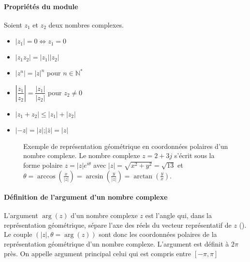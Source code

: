 \paragraph{Propriétés du module}
Soient $z_1$ et $z_2$ deux nombres complexes.
\begin{itemize}
    \item $|z_1|=0 \Leftrightarrow z_1=0$
    \item $|z_1z_2|=|z_1||z_2|$
    \item $|z^n|=|z|^n$ pour $n\in\mathbb{N}^*$
    \item $\left|\dfrac{z_1}{z_2}\right|=\dfrac{|z_1|}{|z_2|}$ pour $z_2\neq0$
    \item $|z_1+z_2|\le|z_1|+|z_2|$
    \item $|-z|=|z|$;$|\bar{z}|=|z|$
\end{itemize}
\begin{figure}[!h]
    \centering
    
    \caption{Exemple de représentation géométrique en coordonnées polaires 
             d'un nombre complexe. Le nombre complexe $z=2+3j$ s'écrit sous 
             la forme polaire $z=|z|e^{i\theta}$ avec 
             $|z|=\sqrt{x^2+y^2}=\sqrt{13}$ et 
             $\theta=\arccos{\left(\frac{x}{|z|}\right)}=
             \arcsin{\left(\frac{y}{|z|}\right)}=
             \arctan{\left(\frac{y}{x}\right)}$.\label{fig-plan_complexe2}}
\end{figure}
\paragraph{Définition de l'argument d'un nombre complexe}
L'argument $\arg{(z)}$ d'un nombre complexe $z$ est l'angle qui, dans la 
représentation géométrique, sépare l'axe des réels du vecteur représentatif de 
$z$ (). Le couple $(|z|,\theta=\arg{(z)})$ sont donc 
les coordonnées polaires de la représentation géométrique d'un nombre complexe.
L'argument est définit à $2\pi$ près. On appelle argument principal celui qui 
est compris entre $[-\pi,\pi]$
